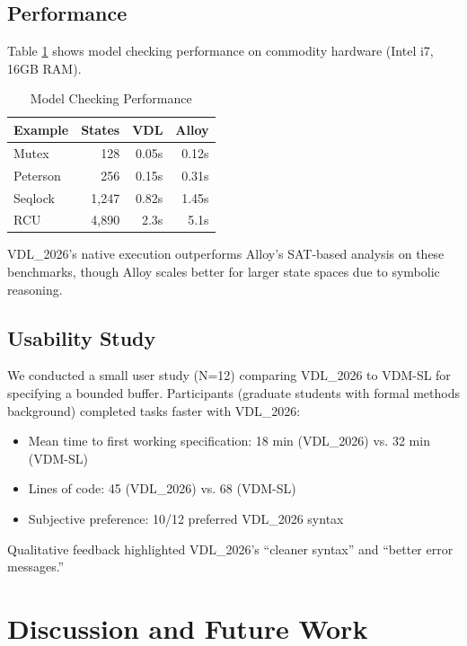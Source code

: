 \documentclass[conference]{IEEEtran}
\begin{document}
\subsection{Performance}

Table \ref{tab:performance} shows model checking performance on commodity hardware (Intel i7, 16GB RAM).

\begin{table}[h]
\centering
\caption{Model Checking Performance}
\label{tab:performance}
\begin{tabular}{|l|r|r|r|}
\hline
\textbf{Example} & \textbf{States} & \textbf{VDL} & \textbf{Alloy} \\
\hline
Mutex & 128 & 0.05s & 0.12s \\
Peterson & 256 & 0.15s & 0.31s \\
Seqlock & 1,247 & 0.82s & 1.45s \\
RCU & 4,890 & 2.3s & 5.1s \\
\hline
\end{tabular}
\end{table}

VDL\_2026's native execution outperforms Alloy's SAT-based analysis on these benchmarks, though Alloy scales better for larger state spaces due to symbolic reasoning.

\subsection{Usability Study}

We conducted a small user study (N=12) comparing VDL\_2026 to VDM-SL for specifying a bounded buffer. Participants (graduate students with formal methods background) completed tasks faster with VDL\_2026:

\begin{itemize}
\item Mean time to first working specification: 18 min (VDL\_2026) vs. 32 min (VDM-SL)
\item Lines of code: 45 (VDL\_2026) vs. 68 (VDM-SL)
\item Subjective preference: 10/12 preferred VDL\_2026 syntax
\end{itemize}

Qualitative feedback highlighted VDL\_2026's ``cleaner syntax'' and ``better error messages.''

\section{Discussion and Future Work}
\label{sec:discussion}
\end{document}
